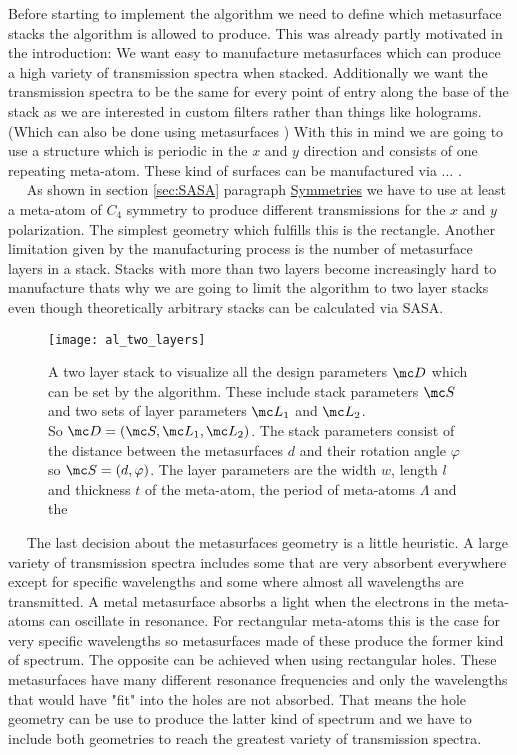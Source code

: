 Before starting to implement the algorithm we need to define which metasurface stacks the algorithm is allowed to produce. This was already partly motivated in the introduction: We want easy to manufacture metasurfaces which can produce a high variety of transmission spectra when stacked. Additionally we want the transmission spectra to be the same for every point of entry along the base of the stack as we are interested in custom filters rather than things like holograms. (Which can also be done using metasurfaces \cite{Mueller2017})
With this in mind we are going to use a structure which is periodic in the
$x$ and $y$ direction and consists of one repeating meta-atom. These kind of surfaces can be manufactured via ... .
\\

$\quad$ As shown in section \ref{sec:SASA} paragraph \hyperref[sec:symmetries]{Symmetries} we have to use at least a meta-atom of $C_4$ symmetry to produce different transmissions for the $x$ and $y$ polarization. The simplest geometry which fulfills this is the rectangle. Another limitation given by the manufacturing process is the number of metasurface layers in a stack. Stacks with more than two layers become increasingly hard to manufacture thats why we are going to limit the algorithm to two layer stacks even though theoretically arbitrary stacks can be calculated via SASA.
\\


\begin{figure}[H]
    \centering
    \texttt{[image: al\_two\_layers]}
    \caption{A two layer stack to visualize all the design parameters
    $\mc D$ which can be set by the algorithm. These include stack parameters $\mc S$ and two sets of layer parameters $\mc L_1$ and $\mc L_2$.\\
    So $\mc D = (\mc S, \mc L_1, \mc L_2)$. The stack parameters consist of the distance between the metasurfaces $d$ and their rotation angle $\varphi$ so $\mc S = (d, \varphi)$. The layer parameters are the width $w$, length $l$ and thickness $t$ of the meta-atom, the period of meta-atoms $\Lambda$ and the  }
    \label{fig:al:two_layers}
\end{figure}


$\quad$ The last decision about the metasurfaces geometry is a little heuristic. A large variety of transmission spectra includes some that are very absorbent everywhere except for specific wavelengths and some where almost all wavelengths are transmitted. A metal metasurface absorbs a light when the electrons in the meta-atoms can oscillate in resonance. For rectangular meta-atoms this is the case for very specific wavelengths so metasurfaces made of these produce the former kind of spectrum. The opposite can be achieved when using rectangular holes. These metasurfaces have many different resonance frequencies and only the wavelengths that would have "fit" into the holes are not absorbed. That means the hole geometry can be use to produce the latter kind of spectrum and we have to include both geometries to reach the greatest variety of transmission spectra.
\\
